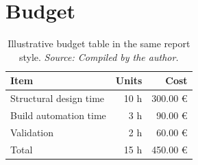 \section{Budget}
\label{sec:budget}

\begin{table}[H]
  \centering
  \begin{tabular}{@{}lrr@{}}
    \toprule
    Item & Units & Cost \\
    \midrule
    Structural design time & 10 h & 300.00 \euro \\
    Build automation time & 3 h & 90.00 \euro \\
    Validation & 2 h & 60.00 \euro \\
    \midrule
    Total & 15 h & 450.00 \euro \\
    \bottomrule
  \end{tabular}
  \caption{Illustrative budget table in the same report style. \textit{Source: Compiled by the author.}}
  \label{tab:budget-summary}
\end{table}

